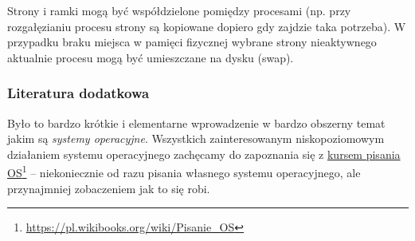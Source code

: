 Strony i ramki mogą być współdzielone pomiędzy procesami (np. przy rozgałęzianiu procesu strony są kopiowane dopiero gdy zajdzie taka potrzeba). W przypadku braku miejsca w pamięci fizycznej wybrane strony nieaktywnego aktualnie procesu mogą być umieszczane na dysku (swap).

\subsubsection{Literatura dodatkowa }

Było to bardzo krótkie i elementarne wprowadzenie w bardzo obszerny temat jakim są \textit{systemy operacyjne}. Wszystkich zainteresowanym niskopoziomowym działaniem systemu operacyjnego zachęcamy do zapoznania się z \href{https://pl.wikibooks.org/wiki/Pisanie_OS}{kursem pisania OS}\footnote{\url{https://pl.wikibooks.org/wiki/Pisanie_OS}} – niekoniecznie od razu pisania własnego systemu operacyjnego, ale przynajmniej zobaczeniem jak to się robi.
